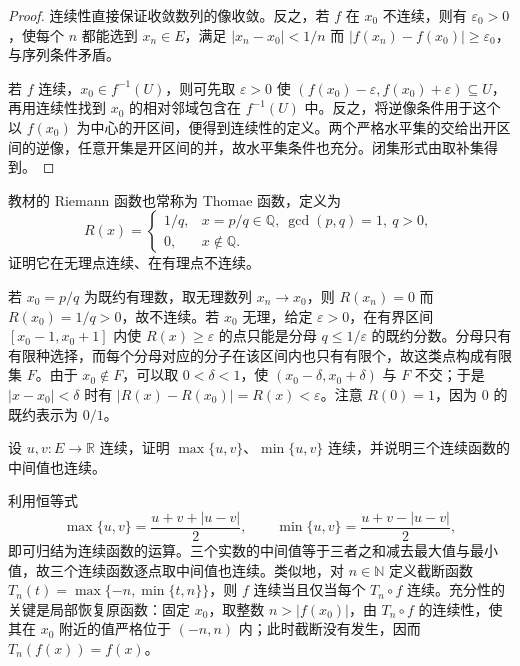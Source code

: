 \begin{proof}
连续性直接保证收敛数列的像收敛。反之，若 $f$ 在 $x_0$ 不连续，则有 $\varepsilon_0>0$，使每个 $n$ 都能选到 $x_n\in E$，满足 $|x_n-x_0|<1/n$ 而 $|f(x_n)-f(x_0)|\ge\varepsilon_0$，与序列条件矛盾。

若 $f$ 连续，$x_0\in f^{-1}(U)$，则可先取 $\varepsilon>0$ 使 $(f(x_0)-\varepsilon,f(x_0)+\varepsilon)\subseteq U$，再用连续性找到 $x_0$ 的相对邻域包含在 $f^{-1}(U)$ 中。反之，将逆像条件用于这个以 $f(x_0)$ 为中心的开区间，便得到连续性的定义。两个严格水平集的交给出开区间的逆像，任意开集是开区间的并，故水平集条件也充分。闭集形式由取补集得到。
\end{proof}

\begin{example}
\label{ex:pei-thomae}
教材的 Riemann 函数也常称为 Thomae 函数，定义为
\[
R(x)=\begin{cases}
1/q,&x=p/q\in\mathbb Q,\ \gcd(p,q)=1,\ q>0,\\
0,&x\notin\mathbb Q.
\end{cases}
\]
证明它在无理点连续、在有理点不连续。
\end{example}

\begin{solve}
若 $x_0=p/q$ 为既约有理数，取无理数列 $x_n\to x_0$，则 $R(x_n)=0$ 而 $R(x_0)=1/q>0$，故不连续。若 $x_0$ 无理，给定 $\varepsilon>0$，在有界区间 $[x_0-1,x_0+1]$ 内使 $R(x)\ge\varepsilon$ 的点只能是分母 $q\le1/\varepsilon$ 的既约分数。分母只有有限种选择，而每个分母对应的分子在该区间内也只有有限个，故这类点构成有限集 $F$。由于 $x_0\notin F$，可以取 $0<\delta<1$，使 $(x_0-\delta,x_0+\delta)$ 与 $F$ 不交；于是 $|x-x_0|<\delta$ 时有 $|R(x)-R(x_0)|=R(x)<\varepsilon$。注意 $R(0)=1$，因为 $0$ 的既约表示为 $0/1$。
\end{solve}

\begin{example}
设 $u,v:E\to\mathbb R$ 连续，证明 $\max\{u,v\}$、$\min\{u,v\}$ 连续，并说明三个连续函数的中间值也连续。
\end{example}

\begin{solve}
利用恒等式
\[
\max\{u,v\}=\frac{u+v+|u-v|}{2},\qquad
\min\{u,v\}=\frac{u+v-|u-v|}{2},
\]
即可归结为连续函数的运算。三个实数的中间值等于三者之和减去最大值与最小值，故三个连续函数逐点取中间值也连续。类似地，对 $n\in\mathbb N$ 定义截断函数 $T_n(t)=\max\{-n,\min\{t,n\}\}$，则 $f$ 连续当且仅当每个 $T_n\circ f$ 连续。充分性的关键是局部恢复原函数：固定 $x_0$，取整数 $n>|f(x_0)|$，由 $T_n\circ f$ 的连续性，使其在 $x_0$ 附近的值严格位于 $(-n,n)$ 内；此时截断没有发生，因而 $T_n(f(x))=f(x)$。
\end{solve}

